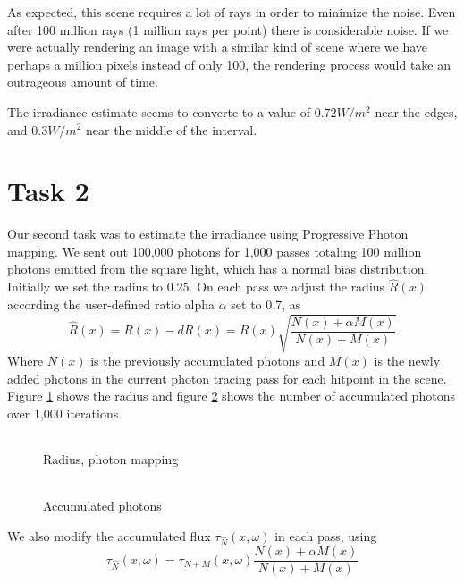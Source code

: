 \documentclass{article} %
\begin{document}
As expected, this scene requires a lot of rays in order to minimize the noise. Even after 100 million rays (1 million rays per point) there is considerable noise. If we were actually rendering an image with a similar kind of scene where we have perhaps a million pixels instead of only 100, the rendering process would take an outrageous amount of time.

The irradiance estimate seems to converte to a value of $0.72W/m^2$ near the edges, and $0.3W/m^2$ near the middle of the interval.

\section*{Task 2}
Our second task was to estimate the irradiance using Progressive Photon mapping.  We sent out 100,000 photons for 1,000 passes totaling 100 million photons emitted from the square light, which has a normal bias distribution. Initially we set the radius to $0.25$. On each pass we adjust the radius $\hat{R}(x)$ according the user-defined ratio alpha $\alpha$ set to 0.7, as
$$ \hat{R}(x) = R(x) - dR(x) = R(x)\sqrt{\frac{N(x)+\alpha M(x)}{N(x)+M(x)}}$$
Where $N(x)$ is the previously accumulated photons and $M(x)$ is the newly added photons in the current photon tracing pass for each hitpoint in the scene. Figure \ref{fig:pm_radius} shows the radius and figure \ref{fig:pm_acc} shows the number of accumulated photons over 1,000 iterations.

\begin{figure}[H]
\begin{tabular}{c}
\end{tabular}
\caption{Radius, photon mapping}
\label{fig:pm_radius}
\end{figure}

\begin{figure}[h]
\begin{tabular}{c}
\end{tabular}
\caption{Accumulated photons}
\label{fig:pm_acc}
\end{figure}

We also modify the accumulated flux $\tau_{\hat{N}}(x, \omega)$ in each pass, using
$$\tau_{\hat{N}}(x, \omega) = \tau_{N+M}(x, \omega)\frac{N(x) + \alpha M(x)}{N(x) + M(x)}$$
\end{document}
